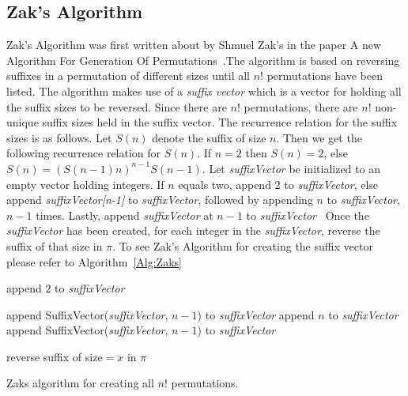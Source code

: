 \subsection{Zak's Algorithm}
Zak's Algorithm was first written about by Shmuel Zak's in the paper A new Algorithm For
Generation Of Permutations~\cite{A31}.The algorithm is based on reversing suffixes in a permutation 
of different sizes until all $n!$ permutations have been listed. The algorithm makes 
use of a \emph{suffix vector} which is a vector for holding all the suffix sizes to be reversed. 
Since there are $n!$ permutations, there are $n!$ non-unique suffix sizes held in the suffix vector.
The recurrence relation for the suffix sizes is as follows. Let $S(n)$ denote the suffix of size $n$. 
Then we get the following recurrence relation for $S(n)$. If $n=2$ then $S(n)=2$, else 
$S(n)=(S(n-1)n)^{n-1}S(n-1)$. Let \emph{suffixVector} be initialized to an empty vector holding integers. If $n$ equals 
two, append $2$ to \emph{suffixVector}, else append \emph{suffixVector[n-1]} to 
\emph{suffixVector}, followed by appending $n$ to \emph{suffixVector}, $n-1$ times. 
Lastly, append \emph{suffixVector} at $n-1$ to \emph{suffixVector}~\cite{A31}
 Once the \emph{suffixVector} has been created, for each integer in the \emph{suffixVector}, reverse 
the suffix of that size in $\pi$. To see Zak's Algorithm for creating the suffix vector please refer to 
Algorithm~\ref{Alg:Zaks}\pagebreak
\begin{algorithm}[t]
    
    \begin{algorithmic}[1]
           \State append $2$ to \textit{suffixVector}
        
        \Else 
                \State append {\sc SuffixVector(\textit{suffixVector}, $n-1$)} to \textit{suffixVector}
                \State append $n$ to \textit{suffixVector}
            \EndFor
            \State append {\sc SuffixVector(\textit{suffixVector}, $n-1$)} to \textit{suffixVector}
        \EndIf
        \EndFunction
    \end{algorithmic}
    \begin{algorithmic}[1]
                \State reverse suffix of size$=x$ in $\pi$
            \EndFor
        \EndFunction
    \end{algorithmic}
    \caption{Zaks algorithm for creating all $n!$ permutations.}
    \label{Alg:Zaks}
\end{algorithm}





